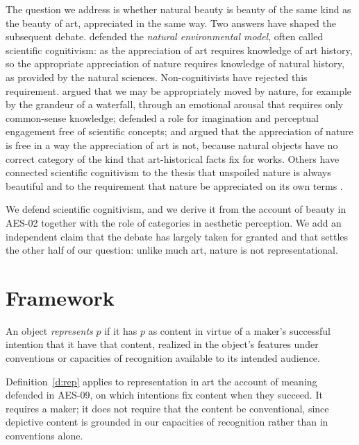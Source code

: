 \documentclass{situationist-preprint}
\begin{document}
The question we address is whether natural beauty is beauty of the same kind as the beauty of art, appreciated in the same way. Two answers have shaped the subsequent debate. \citet{Carlson1979,Carlson2000} defended the \emph{natural environmental model}, often called scientific cognitivism: as the appreciation of art requires knowledge of art history, so the appropriate appreciation of nature requires knowledge of natural history, as provided by the natural sciences. Non-cognitivists have rejected this requirement. \citet{NCarroll1993} argued that we may be appropriately moved by nature, for example by the grandeur of a waterfall, through an emotional arousal that requires only common-sense knowledge; \citet{Brady2003} defended a role for imagination and perceptual engagement free of scientific concepts; and \citet{Budd2002} argued that the appreciation of nature is free in a way the appreciation of art is not, because natural objects have no correct category of the kind that art-historical facts fix for works. Others have connected scientific cognitivism to the thesis that unspoiled nature is always beautiful \citep{Parsons2002} and to the requirement that nature be appreciated on its own terms \citep{Saito1998}.

We defend scientific cognitivism, and we derive it from the account of beauty in AES-02 together with the role of categories in aesthetic perception. We add an independent claim that the debate has largely taken for granted and that settles the other half of our question: unlike much art, nature is not representational.

\section{Framework}

\begin{definition}[Representation]\label{d:rep}
An object \emph{represents} $p$ if it has $p$ as content in virtue of a maker's successful intention that it have that content, realized in the object's features under conventions or capacities of recognition available to its intended audience.
\end{definition}

Definition~\ref{d:rep} applies to representation in art the account of meaning defended in AES-09, on which intentions fix content when they succeed. It requires a maker; it does not require that the content be conventional, since depictive content is grounded in our capacities of recognition rather than in conventions alone.
\end{document}

